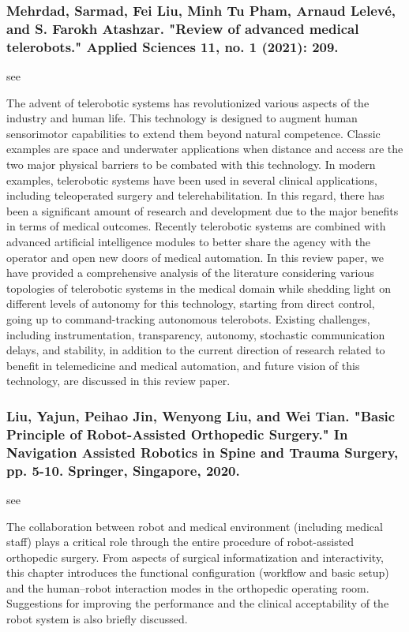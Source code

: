 \documentclass[conference]{IEEEtran}
\begin{document}
\medskip
\subsubsection{Mehrdad, Sarmad, Fei Liu, Minh Tu Pham, Arnaud Lelevé, and S. Farokh Atashzar. "Review of advanced medical telerobots." Applied Sciences 11, no. 1 (2021): 209.}
see \cite{mehrdad2021review}

The advent of telerobotic systems has revolutionized various aspects of the industry and human life. This technology is designed to augment human sensorimotor capabilities to extend them beyond natural competence. Classic examples are space and underwater applications when distance and access are the two major physical barriers to be combated with this technology. In modern examples, telerobotic systems have been used in several clinical applications, including teleoperated surgery and telerehabilitation. In this regard, there has been a significant amount of research and development due to the major benefits in terms of medical outcomes. Recently telerobotic systems are combined with advanced artificial intelligence modules to better share the agency with the operator and open new doors of medical automation. In this review paper, we have provided a comprehensive analysis of the literature considering various topologies of telerobotic systems in the medical domain while shedding light on different levels of autonomy for this technology, starting from direct control, going up to command-tracking autonomous telerobots. Existing challenges, including instrumentation, transparency, autonomy, stochastic communication delays, and stability, in addition to the current direction of research related to benefit in telemedicine and medical automation, and future vision of this technology, are discussed in this review paper.

\medskip
\subsubsection{Liu, Yajun, Peihao Jin, Wenyong Liu, and Wei Tian. "Basic Principle of Robot-Assisted Orthopedic Surgery." In Navigation Assisted Robotics in Spine and Trauma Surgery, pp. 5-10. Springer, Singapore, 2020.}
see \cite{liu2020basic}

The collaboration between robot and medical environment (including medical staff) plays a critical role through the entire procedure of robot-assisted orthopedic surgery. From aspects of surgical informatization and interactivity, this chapter introduces the functional configuration (workflow and basic setup) and the human–robot interaction modes in the orthopedic operating room. Suggestions for improving the performance and the clinical acceptability of the robot system is also briefly discussed.
\end{document}
